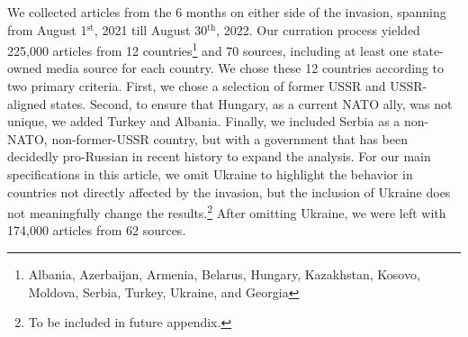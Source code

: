 \documentclass[12pt]{article}
\begin{document}
We collected articles from the 6 months on either side of the invasion, spanning from August 1$^{\text{st}}$, 2021 till August 30$^{\text{th}}$, 2022. Our curration process yielded 225,000 articles from 12 countries\footnote{Albania, Azerbaijan, Armenia, Belarus, Hungary, Kazakhstan, Kosovo, Moldova, Serbia, Turkey, Ukraine, and Georgia} and 70 sources, including at least one state-owned media source for each country. We chose these 12 countries according to two primary criteria. First, we chose a selection of former USSR and USSR-aligned states. Second, to ensure that Hungary, as a current NATO ally, was not unique, we added Turkey and Albania. Finally, we included Serbia as a non-NATO, non-former-USSR country, but with a government that has been decidedly pro-Russian in recent history to expand the analysis. For our main specifications in this article, we omit Ukraine to highlight the behavior in countries not directly affected by the invasion, but the inclusion of Ukraine does not meaningfully change the results.\footnote{To be included in future appendix.} After omitting Ukraine, we were left with 174,000 articles from 62 sources. 
\end{document}
